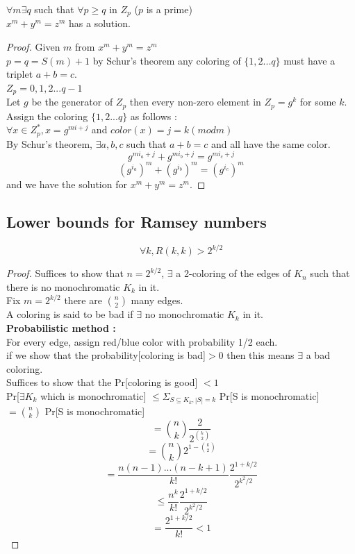 \begin{theorem}
$\forall m \exists q$ such that $\forall p\geq q$ in $Z_p$ ($p$ is a prime) \\
$x^m +y^m = z^m$ has a solution.
\end{theorem}
\begin{proof}
Given $m$ from $ x^m +y^m = z^m$\\
$p=q=S(m)+1$ by Schur's theorem any coloring of $\{1,2...q\}$ must have a triplet $a+b = c$.\\
$Z_p = {0,1,2...q-1}$\\
Let $g$ be the generator of $Z_p$ then every non-zero element in $Z_p = g^k$ for some $k$.\\

Assign the coloring $\{1,2...q\}$ as follows :\\
$\forall x \in Z_p^*,  x=g^{mi+j}$ and $color(x)= j = k (mod m)$\\

By Schur's theorem, $\exists a,b,c$ such that $a+b=c$ and all have the same color.\\
$$g^{mi_a+j} + g^{mi_b+j} = g^{mi_c+j}$$
$$(g^{i_a})^m + (g^{i_b})^m = (g^{i_c})^m$$
and we have the solution for $x^m +y^m = z^m$. 
\end{proof}

\subsection{Lower bounds for Ramsey numbers}
\begin{claim}
$$\forall k, R(k,k) > 2^{k/2}$$
\end{claim}
\begin{proof}
Suffices to show that $n = 2^{k/2}$, $\exists$ a 2-coloring of the edges of $K_n$ such that there is no monochromatic $K_k$ in it.\\

Fix $m = 2^{k/2}$ there are $n\choose 2$ many edges.\\
A coloring is said to be bad if $\exists$ no monochromatic $K_k$ in it.\\

\textbf{Probabilistic method :}\\
For every edge, assign red/blue color with probability 1/2 each.\\
if we show that the probability[coloring is bad]$ > 0$ then this means $\exists$ a bad coloring.\\

Suffices to show that the Pr[coloring is good] $<1$\\
Pr[$\exists K_k$ which is monochromatic] $\leq \Sigma_{S \subseteq K_k,|S|=k}$ Pr[S is monochromatic]\\
$ = {n\choose k}$ Pr[S is monochromatic]
$$ = {n\choose k} \frac{2}{2^{k\choose 2}}$$
$$= {n\choose k} 2^{1-{k\choose2}}$$
$$ =\frac{n(n-1)...(n-k+1)}{k!} \frac{2^{1+k/2}}{2^{k^2/2}}$$
$$ \leq \frac{n^k}{k!} \frac{2^{1+k/2}}{2^{k^2/2}}$$
$$= \frac{2^{1+k/2}}{k!} < 1$$
\end{proof}
